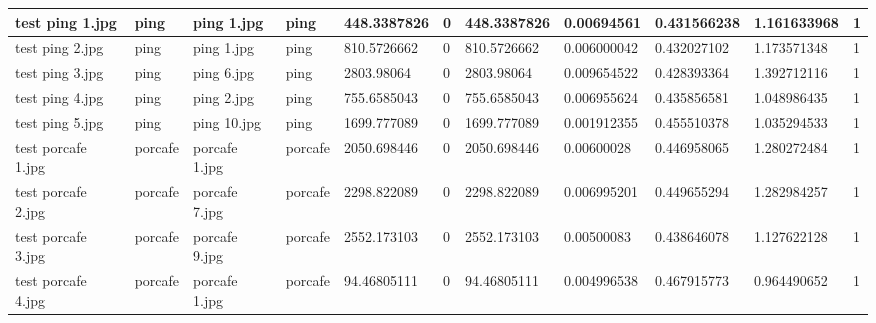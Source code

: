 \begin{landscape}
\begin{longtable}{|p{2cm}|p{1.5cm}|p{2cm}|p{1.5cm}|p{2cm}|p{1cm}|p{2cm}|p{2cm}|p{2cm}|p{2cm}|p{1cm}|}
		test ping 1.jpg      & ping             & ping 1.jpg            & ping                        & 448.3387826           & 0                       & 448.3387826                & 0.00694561            & 0.431566238           & 1.161633968              & 1                \\ \hline
		test ping 2.jpg      & ping             & ping 1.jpg            & ping                        & 810.5726662           & 0                       & 810.5726662                & 0.006000042           & 0.432027102           & 1.173571348              & 1                \\ \hline
		test ping 3.jpg      & ping             & ping 6.jpg            & ping                        & 2803.98064            & 0                       & 2803.98064                 & 0.009654522           & 0.428393364           & 1.392712116              & 1                \\ \hline
		test ping 4.jpg      & ping             & ping 2.jpg            & ping                        & 755.6585043           & 0                       & 755.6585043                & 0.006955624           & 0.435856581           & 1.048986435              & 1                \\ \hline
		test ping 5.jpg      & ping             & ping 10.jpg           & ping                        & 1699.777089           & 0                       & 1699.777089                & 0.001912355           & 0.455510378           & 1.035294533              & 1                \\ \hline
		test porcafe 1.jpg   & porcafe          & porcafe 1.jpg         & porcafe                     & 2050.698446           & 0                       & 2050.698446                & 0.00600028            & 0.446958065           & 1.280272484              & 1                \\ \hline
		test porcafe 2.jpg   & porcafe          & porcafe 7.jpg         & porcafe                     & 2298.822089           & 0                       & 2298.822089                & 0.006995201           & 0.449655294           & 1.282984257              & 1                \\ \hline
		test porcafe 3.jpg   & porcafe          & porcafe 9.jpg         & porcafe                     & 2552.173103           & 0                       & 2552.173103                & 0.00500083            & 0.438646078           & 1.127622128              & 1                \\ \hline
		test porcafe 4.jpg   & porcafe          & porcafe 1.jpg         & porcafe                     & 94.46805111           & 0                       & 94.46805111                & 0.004996538           & 0.467915773           & 0.964490652              & 1                \\ \hline

\end{longtable}
\end{landscape}
